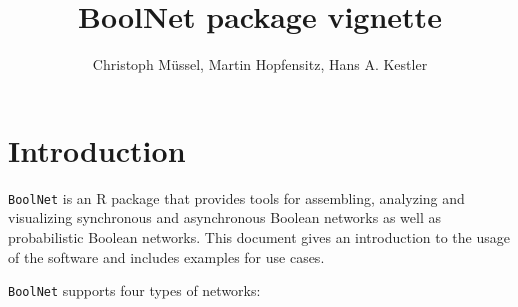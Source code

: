 \documentclass[a4paper]{article}
\title{BoolNet package vignette}
\author{Christoph M\"ussel, Martin Hopfensitz, Hans A. Kestler}
\begin{document}
\maketitle
\tableofcontents

\clearpage
\section{Introduction}

\texttt{BoolNet} is an R package that provides tools for assembling, analyzing and visualizing synchronous and asynchronous Boolean networks as well as probabilistic Boolean networks. This document gives an introduction to the usage of the software and includes examples for use cases.

\texttt{BoolNet} supports four types of networks:
\end{document}
